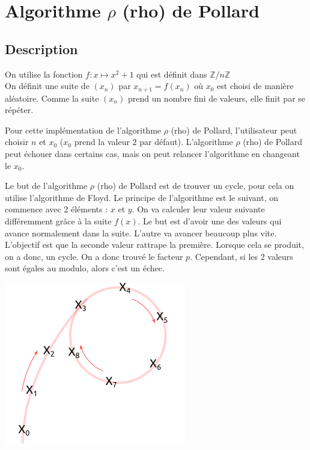 \documentclass[a4paper, 12pt]{article}
\begin{document}
\newpage
\section{Algorithme $\rho$ (rho) de Pollard}

\subsection{Description}

On utilise la fonction $f : x \mapsto x^2 + 1$ qui est définit dans $\mathbb{Z} / n \mathbb{Z}$ \\
On définit une suite de $(x_n)$ par $x_{n + 1} = f(x_n)$  où $x_0$ est choisi de manière aléatoire. Comme la suite $(x_n)$ prend un nombre fini de valeurs, elle finit par se répéter.

Pour cette implémentation de l'algorithme $\rho$ (rho) de Pollard, l'utilisateur peut choisir $n$ et $x_0$ ($x_0$ prend la valeur $2$ par défaut). L'algorithme $\rho$ (rho) de Pollard peut échouer dans certains cas, mais on peut relancer l'algorithme en changeant le $x_0$.

Le but de l'algorithme $\rho$ (rho) de Pollard est de trouver un cycle, pour cela on utilise l'algorithme de Floyd. Le principe de l'algorithme est le suivant, on commence avec 2 éléments : $x$ et $y$. On va calculer leur valeur suivante différemment grâce à la suite $f(x)$. Le but est d'avoir une des valeurs qui avance normalement dans la suite. L'autre va avancer beaucoup plus vite. L'objectif est que la seconde valeur rattrape la première. Lorsque cela se produit, on a donc, un cycle. On a donc trouvé le facteur $p$. Cependant, si les 2 valeurs sont égales au modulo, alors c'est un échec.

\begin{center}
    \includegraphics[width=0.6\linewidth]{pollardrho.png}
\end{center}
\end{document}
